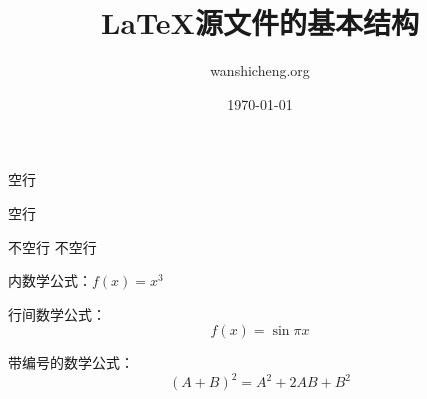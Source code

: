 \documentclass{article} %
\title{\LaTeX 源文件的基本结构}
\author{wanshicheng.org}
\date{\today}
\begin{document}
	\maketitle %
	空行
	
	空行
	
	不空行 %
	不空行
	
	内数学公式：$f(x)=x^3$ %
	
	行间数学公式：$$f(x)=\sin \pi x$$ %
	
	带编号的数学公式：\begin{equation} %
	(A+B)^2=A^2+2AB+B^2%
	\end{equation}
\end{document}
